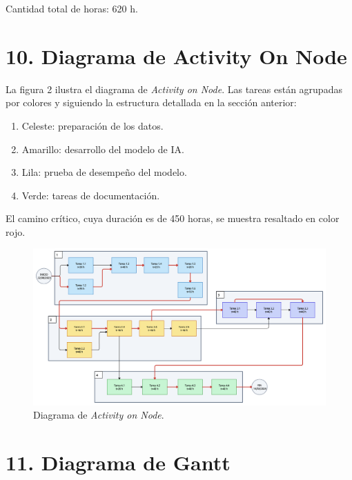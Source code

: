 \documentclass[
11pt, %
]{charter}
\begin{document}
Cantidad total de horas: 620 h.

\section{10. Diagrama de Activity On Node}
\label{sec:AoN}




La figura 2 ilustra el diagrama de \textit{Activity on Node}. Las tareas están agrupadas por colores y siguiendo la estructura detallada en la sección anterior:

\begin{enumerate}
	\item Celeste: preparación de los datos.
	\item Amarillo: desarrollo del modelo de IA.
	\item Lila: prueba de desempeño del modelo.
	\item Verde: tareas de documentación.
\end{enumerate}

El camino crítico, cuya duración es de 450 horas, se muestra resaltado en color rojo.


\begin{figure}[htpb]
\centering 
\includegraphics[width=.8\textwidth]{./Figuras/AoN3.png}
\caption{Diagrama de \textit{Activity on Node}.}
\label{fig:AoN}
\end{figure}


\pagebreak

\section{11. Diagrama de Gantt}
\label{sec:gantt}
\end{document}
